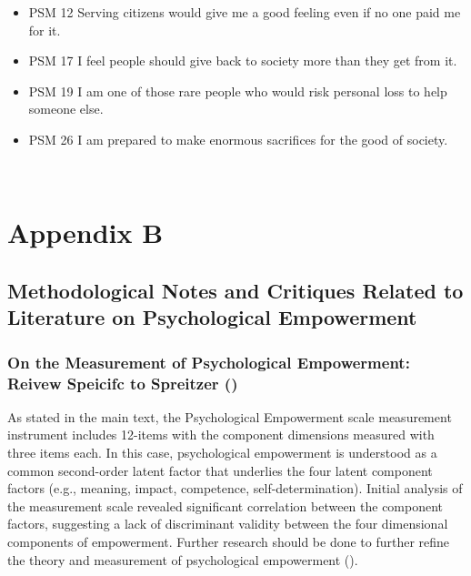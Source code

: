 \documentclass[
  11pt,
  a4paper,
]{article}
\begin{document}
\begin{longtable}[]
\begin{minipage}[t]{\linewidth}
\begin{itemize}
\item
  PSM 12 Serving citizens would give me a good feeling even if no one
  paid me for it.
\item
  PSM 17 I feel people should give back to society more than they get
  from it.
\item
  PSM 19 I am one of those rare people who would risk personal loss to
  help someone else.
\item
  PSM 26 I am prepared to make enormous sacrifices for the good of
  society.
\end{itemize}
\end{minipage} \\
\end{longtable}

\newpage

\section{Appendix B}\label{appendix-b}

\subsection{Methodological Notes and Critiques Related to Literature on
Psychological
Empowerment}\label{methodological-notes-and-critiques-related-to-literature-on-psychological-empowerment}

\subsubsection{\texorpdfstring{On the Measurement of Psychological
Empowerment: Reivew Speicifc to Spreitzer
()}{On the Measurement of Psychological Empowerment: Reivew Speicifc to Spreitzer (1995)}}\label{on-the-measurement-of-psychological-empowerment-reivew-speicifc-to-spreitzer1995}

As stated in the main text, the Psychological Empowerment scale
measurement instrument includes 12-items with the component dimensions
measured with three items each. In this case, psychological empowerment
is understood as a common second-order latent factor that underlies the
four latent component factors (e.g., meaning, impact, competence,
self-determination). Initial analysis of the measurement scale revealed
significant correlation between the component factors, suggesting a lack
of discriminant validity between the four dimensional components of
empowerment. Further research should be done to further refine the
theory and measurement of psychological empowerment
().
\end{document}
